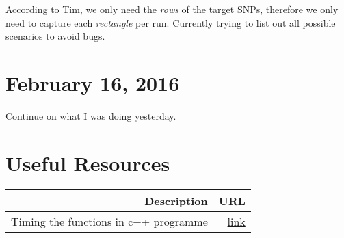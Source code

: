 \documentclass[12pt]{article}
\begin{document}
	According to Tim, we only need the \emph{rows} of the target SNPs, therefore we only need to capture each \emph{rectangle} per run.
	Currently trying to list out all possible scenarios to avoid bugs.
	
	\section{February 16, 2016}
	Continue on what I was doing yesterday.
	
	\newpage
	\section{Useful Resources}
	\begin{table}
		\centering
		\begin{tabular}{rr}
			\toprule
			Description & URL \\
			\midrule
			Timing the functions in c++ programme & \href{http://stackoverflow.com/a/21995693}{link}\\
			\bottomrule
		\end{tabular}
	\end{table}
\end{document}
